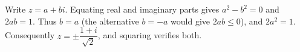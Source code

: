 Write $ z=a+bi $. Equating real and imaginary parts gives $ a^2-b^2=0 $ and $ 2ab=1 $. Thus $ b=a $ (the alternative $ b=-a $ would give $ 2ab\le0 $), and $ 2a^2=1 $. Consequently $\boxed{z=\pm\dfrac{1+i}{\sqrt2}}$, and squaring verifies both.
